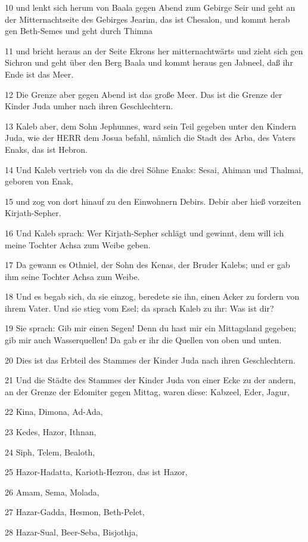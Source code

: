 \par 10 und lenkt sich herum von Baala gegen Abend zum Gebirge Seir und geht an der Mitternachtseite des Gebirges Jearim, das ist Chesalon, und kommt herab gen Beth-Semes und geht durch Thimna
\par 11 und bricht heraus an der Seite Ekrons her mitternachtwärts und zieht sich gen Sichron und geht über den Berg Baala und kommt heraus gen Jabneel, daß ihr Ende ist das Meer.
\par 12 Die Grenze aber gegen Abend ist das große Meer. Das ist die Grenze der Kinder Juda umher nach ihren Geschlechtern.
\par 13 Kaleb aber, dem Sohn Jephunnes, ward sein Teil gegeben unter den Kindern Juda, wie der HERR dem Josua befahl, nämlich die Stadt des Arba, des Vaters Enaks, das ist Hebron.
\par 14 Und Kaleb vertrieb von da die drei Söhne Enaks: Sesai, Ahiman und Thalmai, geboren von Enak,
\par 15 und zog von dort hinauf zu den Einwohnern Debirs. Debir aber hieß vorzeiten Kirjath-Sepher.
\par 16 Und Kaleb sprach: Wer Kirjath-Sepher schlägt und gewinnt, dem will ich meine Tochter Achsa zum Weibe geben.
\par 17 Da gewann es Othniel, der Sohn des Kenas, der Bruder Kalebs; und er gab ihm seine Tochter Achsa zum Weibe.
\par 18 Und es begab sich, da sie einzog, beredete sie ihn, einen Acker zu fordern von ihrem Vater. Und sie stieg vom Esel; da sprach Kaleb zu ihr: Was ist dir?
\par 19 Sie sprach: Gib mir einen Segen! Denn du hast mir ein Mittagsland gegeben; gib mir auch Wasserquellen! Da gab er ihr die Quellen von oben und unten.
\par 20 Dies ist das Erbteil des Stammes der Kinder Juda nach ihren Geschlechtern.
\par 21 Und die Städte des Stammes der Kinder Juda von einer Ecke zu der andern, an der Grenze der Edomiter gegen Mittag, waren diese: Kabzeel, Eder, Jagur,
\par 22 Kina, Dimona, Ad-Ada,
\par 23 Kedes, Hazor, Ithnan,
\par 24 Siph, Telem, Bealoth,
\par 25 Hazor-Hadatta, Karioth-Hezron, das ist Hazor,
\par 26 Amam, Sema, Molada,
\par 27 Hazar-Gadda, Hesmon, Beth-Pelet,
\par 28 Hazar-Sual, Beer-Seba, Bisjothja,
